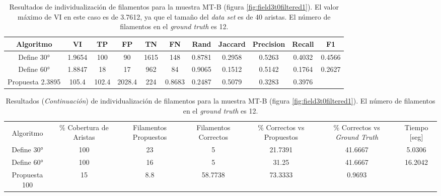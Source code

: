 \begin{table}[t]
    \centering
    \begin{tabular}{|c|c|c|c|c|c|c|c|c|c|c|}
    \hline
        Algoritmo & VI & TP & FP &TN &FN & Rand	& Jaccard &	Precision &	Recall &	F1 \\ \hline
        Define 30° & 1.9654 & 100 & 90 & 1615 & 148 & 0.8781 & 0.2958 & 0.5263 & 0.4032 & 0.4566\\
        Define 60° & 1.8847 & 18 & 17 & 962 & 84 & 0.9065 & 0.1512 & 0.5142 & 0.1764 & 0.2627\\ 
        Propuesta 2.3895 & 105.4 & 102.4 & 2028.4 & 224 & 0.8683 & 0.2487 & 0.5079 & 0.3283 & 0.3976 \\
        \hline
    \end{tabular}
    \caption{Resultados de individualizaci\'on de filamentos para la muestra MT-B (figura \ref{fig:field3t0filtered1}). El valor m\'aximo de VI en este caso es de 3.7612, ya que el tama\~no del {\it data set} es de 40 aristas. El n\'umero de filamentos en el {\it ground truth} es 12.}
    \label{tab:field3t0filtered1}
\end{table}
\addtocounter{table}{-1}
\begin{table}[h]
    \centering
    \begin{tabular}{|c|c|c|c|c|c|c|}
    \hline
         & \multirow{4}{2cm}{\centering \% Cobertura de Aristas} & \multirow{4}{2cm}{Filamentos Propuestos} & \multirow{4}{2cm}{Filamentos Correctos} & \multirow{4}{2.5cm}{\% Correctos vs Propuestos} & \multirow{4}{2.5cm}{\centering \% Correctos vs {\it Ground Truth}} & \multirow{4}{1.2cm}{\centering Tiempo [seg]} \\
         &  &  &  & & &  \\
        Algoritmo &  &  &  & & &  \\
        &  &  &  & & &  \\ \hline
        Define 30° & 100 & 23 & 5 & 21.7391 & 41.6667 & 5.0306 \\
        Define 60° & 100 & 16 & 5 & 31.25 & 41.6667 & 16.2042 \\ 
        Propuesta 100 & 15 & 8.8 & 58.7738 & 73.3333 & 0.9693 \\
        \hline
    \end{tabular}
    \caption{Resultados ({\it Continuaci\'on}) de individualizaci\'on de filamentos para la muestra MT-B (figura \ref{fig:field3t0filtered1}). El n\'umero de filamentos en el {\it ground truth} es 12.}
\end{table}


